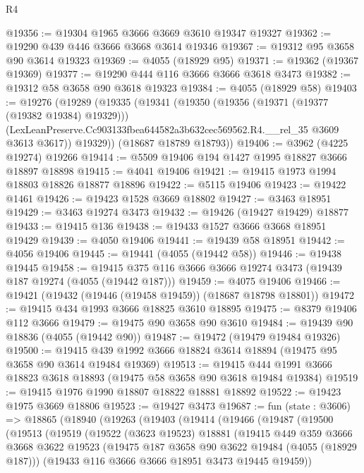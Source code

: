 \begin{lexlean}{R4}
\begin{coremodule}
@19356 := @19304 @1965 @3666 @3669 @3610 @19347 @19327
@19362 := @19290 @439 @446 @3666 @3668 @3614 @19346
@19367 := @19312 @95 @3658 @90 @3614 @19323
@19369 := @4055 (@18929 @95)
@19371 := @19362 (@19367 @19369)
@19377 := @19290 @444 @116 @3666 @3666 @3618 @3473
@19382 := @19312 @58 @3658 @90 @3618 @19323
@19384 := @4055 (@18929 @58)
@19403 := @19276
    (@19289
      (@19335
        (@19341
          (@19350
            (@19356 (@19371 (@19377 (@19382 @19384) @19329)))
            (LexLeanPreserve.Cc903133fbea644582a3b632cec569562.R4.__rel_35 @3609 @3613 @3617))
          @19329))
      (@18687 @18789 @18793))
@19406 := @3962 (@4225 @19274) @19266
@19414 := @5509 @19406 @194 @1427 @1995 @18827 @3666 @18897 @18898
@19415 := @4041 @19406
@19421 := @19415 @1973 @1994 @18803 @18826 @18877 @18896
@19422 := @5115 @19406
@19423 := @19422 @1461
@19426 := @19423 @1528 @3669 @18802
@19427 := @3463 @18951
@19429 := @3463 @19274 @3473
@19432 := @19426 (@19427 @19429) @18877
@19433 := @19415 @136
@19438 := @19433 @1527 @3666 @3668 @18951 @19429
@19439 := @4050 @19406
@19441 := @19439 @58 @18951
@19442 := @4056 @19406
@19445 := @19441 (@4055 (@19442 @58))
@19446 := @19438 @19445
@19458 := @19415 @375 @116 @3666 @3666 @19274 @3473 (@19439 @187 @19274 (@4055 (@19442 @187)))
@19459 := @4075 @19406
@19466 := @19421 (@19432 (@19446 (@19458 @19459)) (@18687 @18798 @18801))
@19472 := @19415 @434 @1993 @3666 @18825 @3610 @18895
@19475 := @8379 @19406 @112 @3666
@19479 := @19475 @90 @3658 @90 @3610
@19484 := @19439 @90 @18836 (@4055 (@19442 @90))
@19487 := @19472 (@19479 @19484 @19326)
@19500 := @19415 @439 @1992 @3666 @18824 @3614 @18894 (@19475 @95 @3658 @90 @3614 @19484 @19369)
@19513 := @19415 @444 @1991 @3666 @18823 @3618 @18893 (@19475 @58 @3658 @90 @3618 @19484 @19384)
@19519 := @19415 @1976 @1990 @18807 @18822 @18881 @18892
@19522 := @19423 @1975 @3669 @18806
@19523 := @19427 @3473
@19687 := fun (state : @3606) =>
  @18865
    (@18940
      (@19263
        (@19403
          (@19414
            (@19466
              (@19487
                (@19500
                  (@19513
                    (@19519
                      (@19522
                        (@3623 @19523)
                        @18881
                        (@19415
                          @449
                          @359
                          @3666
                          @3668
                          @3622
                          @19523
                          (@19475 @187 @3658 @90 @3622 @19484 (@4055 (@18929 @187)))
                          (@19433 @116 @3666 @3666 @18951 @3473 @19445 @19459))

\end{coremodule}
\end{lexlean}
